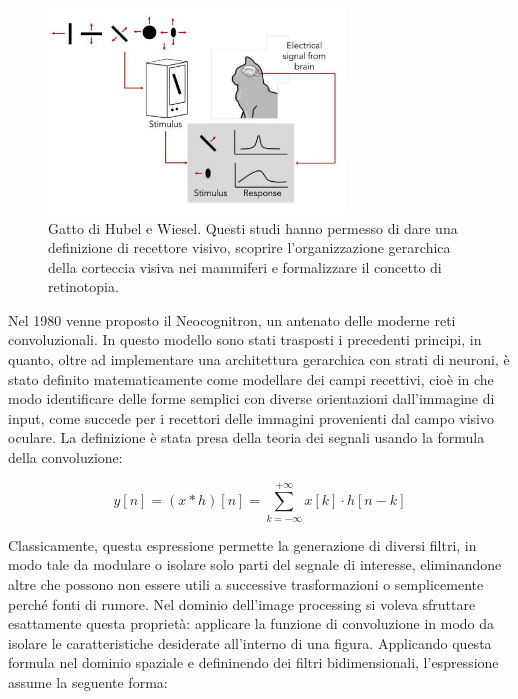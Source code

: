 \begin{figure}[htbp]
    \centering
    \includegraphics[width=0.7\textwidth]{figures/Hubel_and_Wiesel_cat.png}
    \caption{Gatto di Hubel e Wiesel\cite{a5catexp}. Questi studi hanno permesso di dare una definizione di recettore visivo, scoprire l'organizzazione gerarchica della corteccia visiva nei mammiferi e formalizzare il concetto di retinotopia.}
    \label{fig:chatto}
\end{figure}


\noindent Nel 1980 venne proposto il Neocognitron, un antenato delle moderne reti convoluzionali. In questo modello sono stati trasposti i precedenti principi, in quanto, oltre ad implementare una architettura gerarchica con strati di neuroni, è stato definito matematicamente come modellare dei campi recettivi, cioè in che modo identificare delle forme semplici con diverse orientazioni dall'immagine di input, come succede per i recettori delle immagini provenienti dal campo visivo oculare. La definizione è stata presa della teoria dei segnali usando la formula della convoluzione: 

\begin{equation} \label{eq:convolution}
y[n] = (x * h)[n] = \sum_{k=-\infty}^{+\infty} x[k] \cdot h[n - k]
\end{equation}

\noindent Classicamente, questa espressione permette la generazione di diversi filtri, in modo tale da modulare o isolare solo parti del segnale di interesse, eliminandone altre che possono non essere utili a successive trasformazioni o semplicemente perché fonti di rumore. Nel dominio dell'image processing si voleva sfruttare esattamente questa proprietà: applicare la funzione di convoluzione in modo da isolare le caratteristiche desiderate all'interno di una figura. Applicando questa formula nel dominio spaziale e defininendo dei filtri bidimensionali, l'espressione assume la seguente forma: 

